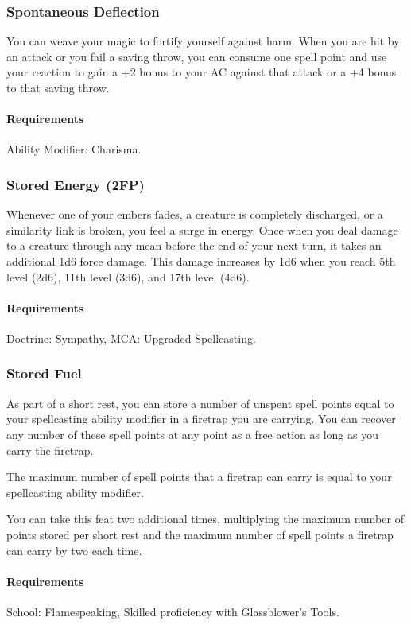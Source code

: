 \subsubsection{Spontaneous Deflection} \label{feat::spontaneousdeflection}
    You can weave your magic to fortify yourself against harm.
    When you are hit by an attack or you fail a saving throw, you can consume one spell point and use your reaction to gain a +2 bonus to your AC against that attack or a +4 bonus to that saving throw.
    \paragraph{Requirements} Ability Modifier: Charisma.
\subsubsection{Stored Energy (2FP)} \label{feat::storedenergy}
    Whenever one of your embers fades, a creature is completely discharged, or a similarity link is broken, you feel a surge in energy.
    Once when you deal damage to a creature through any mean before the end of your next turn, it takes an additional 1d6 force damage.
    This damage increases by 1d6 when you reach 5th level (2d6), 11th level (3d6), and 17th level (4d6).
    \paragraph{Requirements} Doctrine: Sympathy, MCA: Upgraded Spellcasting.
\subsubsection{Stored Fuel} \label{feat::storedfuel}
    As part of a short rest, you can store a number of unspent spell points equal to your spellcasting ability modifier in a firetrap you are carrying.
    You can recover any number of these spell points at any point as a free action as long as you carry the firetrap.

    The maximum number of spell points that a firetrap can carry is equal to your spellcasting ability modifier.

    You can take this feat two additional times, multiplying the maximum number of points stored per short rest and the maximum number of spell points a firetrap can carry by two each time.
    \paragraph{Requirements} School: Flamespeaking, Skilled proficiency with Glassblower's Tools.
